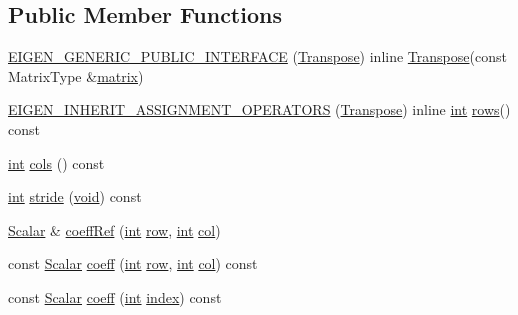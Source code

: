\subsection*{Public Member Functions}
\begin{DoxyCompactItemize}
\item 
\hyperlink{class_transpose_a70389438590022d3cb7fa419065be4ae}{E\-I\-G\-E\-N\-\_\-\-G\-E\-N\-E\-R\-I\-C\-\_\-\-P\-U\-B\-L\-I\-C\-\_\-\-I\-N\-T\-E\-R\-F\-A\-C\-E} (\hyperlink{class_transpose}{Transpose}) inline \hyperlink{class_transpose}{Transpose}(const Matrix\-Type \&\hyperlink{glext_8h_a7b24a3f2f56eb1244ae69dacb4fecb6f}{matrix})
\item 
\hyperlink{class_transpose_a93339dfff39e4b40441234e47523844f}{E\-I\-G\-E\-N\-\_\-\-I\-N\-H\-E\-R\-I\-T\-\_\-\-A\-S\-S\-I\-G\-N\-M\-E\-N\-T\-\_\-\-O\-P\-E\-R\-A\-T\-O\-R\-S} (\hyperlink{class_transpose}{Transpose}) inline \hyperlink{ioapi_8h_a787fa3cf048117ba7123753c1e74fcd6}{int} \hyperlink{class_matrix_base_ae82810ba95da637cdf434b4274083723}{rows}() const 
\item 
\hyperlink{ioapi_8h_a787fa3cf048117ba7123753c1e74fcd6}{int} \hyperlink{class_transpose_a916b0f16fc367eab5f9080f3e03d022c}{cols} () const 
\item 
\hyperlink{ioapi_8h_a787fa3cf048117ba7123753c1e74fcd6}{int} \hyperlink{class_transpose_a0f986b47c93a53b05012fced4a2a0bac}{stride} (\hyperlink{group___u_a_v_objects_plugin_ga444cf2ff3f0ecbe028adce838d373f5c}{void}) const 
\item 
\hyperlink{class_matrix_base_a625df8339dc2d816cbc0fd66e7dadaf5}{Scalar} \& \hyperlink{class_transpose_a91f625be6564b421332553a499983a80}{coeff\-Ref} (\hyperlink{ioapi_8h_a787fa3cf048117ba7123753c1e74fcd6}{int} \hyperlink{glext_8h_a11b277b422822f784ee248b43eee3e1e}{row}, \hyperlink{ioapi_8h_a787fa3cf048117ba7123753c1e74fcd6}{int} \hyperlink{class_matrix_base_ae3c94b0f25b4273c7a8125169bdf60e0}{col})
\item 
const \hyperlink{class_matrix_base_a625df8339dc2d816cbc0fd66e7dadaf5}{Scalar} \hyperlink{class_transpose_a291dae2cb6004fa3ed3fdd76c4b664b3}{coeff} (\hyperlink{ioapi_8h_a787fa3cf048117ba7123753c1e74fcd6}{int} \hyperlink{glext_8h_a11b277b422822f784ee248b43eee3e1e}{row}, \hyperlink{ioapi_8h_a787fa3cf048117ba7123753c1e74fcd6}{int} \hyperlink{class_matrix_base_ae3c94b0f25b4273c7a8125169bdf60e0}{col}) const 
\item 
const \hyperlink{class_matrix_base_a625df8339dc2d816cbc0fd66e7dadaf5}{Scalar} \hyperlink{class_transpose_a7f0a28834c765e16b97b4e85772fdcfc}{coeff} (\hyperlink{ioapi_8h_a787fa3cf048117ba7123753c1e74fcd6}{int} \hyperlink{glext_8h_ab47dd9958bcadea08866b42bf358e95e}{index}) const 

\end{DoxyCompactItemize}
